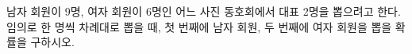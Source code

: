남자 회원이 9명, 여자 회원이 6명인 어느 사진 동호회에서 대표 2명을 뽑으려고 한다. 임의로 한 명씩 차례대로 뽑을 때, 첫 번째에 남자 회원, 두 번째에 여자 회원을 뽑을 확률을 구하시오.

